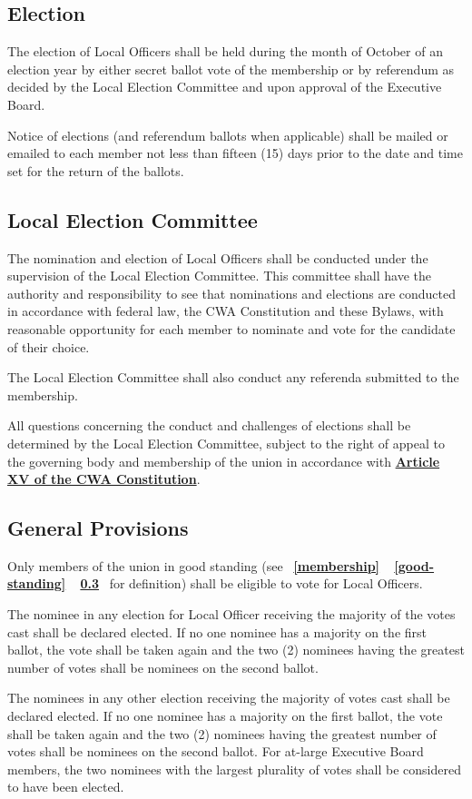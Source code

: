 \documentclass[11pt]{article}
\let\oldhref\href
\renewcommand{\href}[2]{\oldhref{#1}{\bfseries#2}}
\newcommand{\fullref}[3]{%
  \mbox{\textbf{%
    \ifthenelse{\isempty{#1}}%
    {}%
    {\ref{#1}}%
    \ifthenelse{\isempty{#2}}%
    {}%
    {%
      \ifthenelse{\isempty{#1}}{}{, }%
      \ref{#2}%
    }%
    \ifthenelse{\isempty{#3}}%
    {}%
    {\ref{#3}}%
  }}%
}
\begin{document}
\subsection{Election}
The election of Local Officers shall be held during the month of October of an election year by either secret ballot vote of the membership or by referendum as decided by the Local Election Committee and upon approval of the Executive Board.

Notice of elections (and referendum ballots when applicable) shall be mailed or emailed to each member not less than fifteen (15) days prior to the date and time set for the return of the ballots.

\subsection{Local Election Committee}
The nomination and election of Local Officers shall be conducted under the supervision of the Local Election Committee. This committee shall have the authority and responsibility to see that nominations and elections are conducted in accordance with federal law, the CWA Constitution and these Bylaws, with reasonable opportunity for each member to nominate and vote for the candidate of their choice.

The Local Election Committee shall also conduct any referenda submitted to the membership.

All questions concerning the conduct and challenges of elections shall be determined by the Local Election Committee, subject to the right of appeal to the governing body and membership of the union in accordance with \href{https://cwa-union.org/for-locals/cwa-constitution\#A15}{Article XV of the CWA Constitution}.

\subsection{General Provisions}
Only members of the union in good standing (see \fullref{membership}{good-standing}{} for definition) shall be eligible to vote for Local Officers.

The nominee in any election for Local Officer receiving the majority of the votes cast shall be declared elected. If no one nominee has a majority on the first ballot, the vote shall be taken again and the two (2) nominees having the greatest number of votes shall be nominees on the second ballot.

The nominees in any other election receiving the majority of votes cast shall be declared elected. If no one nominee has a majority on the first ballot, the vote shall be taken again and the two (2) nominees having the greatest number of votes shall be nominees on the second ballot. For at-large Executive Board members, the two nominees with the largest plurality of votes shall be considered to have been elected.
\end{document}
